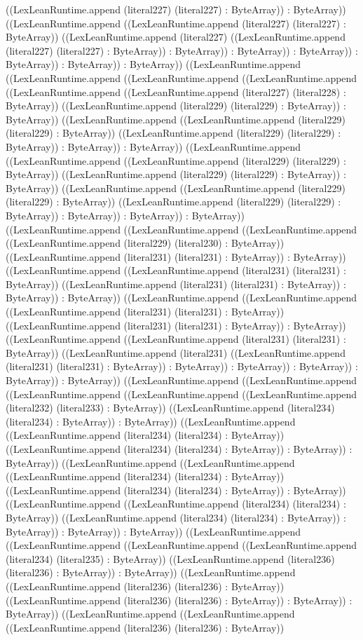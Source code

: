 \documentclass[11pt]{article}
\begin{document}
((LexLeanRuntime.append (literal227) (literal227) : ByteArray)) : ByteArray)) ((LexLeanRuntime.append ((LexLeanRuntime.append (literal227) (literal227) : ByteArray)) ((LexLeanRuntime.append (literal227) ((LexLeanRuntime.append (literal227) (literal227) : ByteArray)) : ByteArray)) : ByteArray)) : ByteArray)) : ByteArray)) : ByteArray)) : ByteArray)) ((LexLeanRuntime.append ((LexLeanRuntime.append ((LexLeanRuntime.append ((LexLeanRuntime.append ((LexLeanRuntime.append ((LexLeanRuntime.append (literal227) (literal228) : ByteArray)) ((LexLeanRuntime.append (literal229) (literal229) : ByteArray)) : ByteArray)) ((LexLeanRuntime.append ((LexLeanRuntime.append (literal229) (literal229) : ByteArray)) ((LexLeanRuntime.append (literal229) (literal229) : ByteArray)) : ByteArray)) : ByteArray)) ((LexLeanRuntime.append ((LexLeanRuntime.append ((LexLeanRuntime.append (literal229) (literal229) : ByteArray)) ((LexLeanRuntime.append (literal229) (literal229) : ByteArray)) : ByteArray)) ((LexLeanRuntime.append ((LexLeanRuntime.append (literal229) (literal229) : ByteArray)) ((LexLeanRuntime.append (literal229) (literal229) : ByteArray)) : ByteArray)) : ByteArray)) : ByteArray)) ((LexLeanRuntime.append ((LexLeanRuntime.append ((LexLeanRuntime.append ((LexLeanRuntime.append (literal229) (literal230) : ByteArray)) ((LexLeanRuntime.append (literal231) (literal231) : ByteArray)) : ByteArray)) ((LexLeanRuntime.append ((LexLeanRuntime.append (literal231) (literal231) : ByteArray)) ((LexLeanRuntime.append (literal231) (literal231) : ByteArray)) : ByteArray)) : ByteArray)) ((LexLeanRuntime.append ((LexLeanRuntime.append ((LexLeanRuntime.append (literal231) (literal231) : ByteArray)) ((LexLeanRuntime.append (literal231) (literal231) : ByteArray)) : ByteArray)) ((LexLeanRuntime.append ((LexLeanRuntime.append (literal231) (literal231) : ByteArray)) ((LexLeanRuntime.append (literal231) ((LexLeanRuntime.append (literal231) (literal231) : ByteArray)) : ByteArray)) : ByteArray)) : ByteArray)) : ByteArray)) : ByteArray)) ((LexLeanRuntime.append ((LexLeanRuntime.append ((LexLeanRuntime.append ((LexLeanRuntime.append ((LexLeanRuntime.append (literal232) (literal233) : ByteArray)) ((LexLeanRuntime.append (literal234) (literal234) : ByteArray)) : ByteArray)) ((LexLeanRuntime.append ((LexLeanRuntime.append (literal234) (literal234) : ByteArray)) ((LexLeanRuntime.append (literal234) (literal234) : ByteArray)) : ByteArray)) : ByteArray)) ((LexLeanRuntime.append ((LexLeanRuntime.append ((LexLeanRuntime.append (literal234) (literal234) : ByteArray)) ((LexLeanRuntime.append (literal234) (literal234) : ByteArray)) : ByteArray)) ((LexLeanRuntime.append ((LexLeanRuntime.append (literal234) (literal234) : ByteArray)) ((LexLeanRuntime.append (literal234) (literal234) : ByteArray)) : ByteArray)) : ByteArray)) : ByteArray)) ((LexLeanRuntime.append ((LexLeanRuntime.append ((LexLeanRuntime.append ((LexLeanRuntime.append (literal234) (literal235) : ByteArray)) ((LexLeanRuntime.append (literal236) (literal236) : ByteArray)) : ByteArray)) ((LexLeanRuntime.append ((LexLeanRuntime.append (literal236) (literal236) : ByteArray)) ((LexLeanRuntime.append (literal236) (literal236) : ByteArray)) : ByteArray)) : ByteArray)) ((LexLeanRuntime.append ((LexLeanRuntime.append ((LexLeanRuntime.append (literal236) (literal236) : ByteArray)) 
\end{document}
